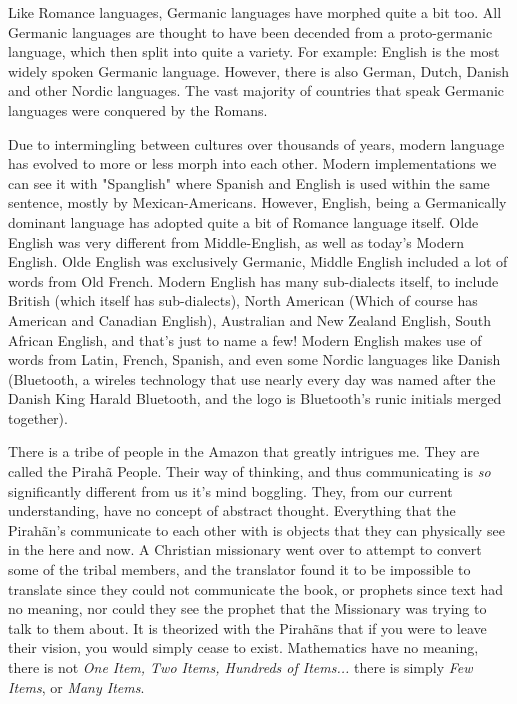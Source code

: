 \documentclass[12pt]{article}
\begin{document}
\par
Like Romance languages, Germanic languages have morphed quite a bit too. All Germanic languages are thought to have been decended from a proto-germanic language, which then split into quite a variety. For example: English is the most widely spoken Germanic language. However, there is also German, Dutch, Danish and other Nordic languages. The vast majority of countries that speak Germanic languages were conquered by the Romans.
\par
Due to intermingling between cultures over thousands of years, modern language has evolved to more or less morph into each other. Modern implementations we can see it with "Spanglish" where Spanish and English is used within the same sentence, mostly by Mexican-Americans. However, English, being a Germanically dominant language has adopted quite a bit of Romance language itself. Olde English was very different from Middle-English, as well as today's Modern English. Olde English was exclusively Germanic, Middle English included a lot of words from Old French. Modern English has many sub-dialects itself, to include British (which itself has sub-dialects), North American (Which of course has American and Canadian English), Australian and New Zealand English, South African English, and that's just to name a few! Modern English makes use of words from Latin, French, Spanish, and even some Nordic languages like Danish (Bluetooth, a wireles technology that use nearly every day was named after the Danish King Harald Bluetooth, and the logo is Bluetooth's runic initials merged together).
\par
There is a tribe of people in the Amazon that greatly intrigues me. They are called the Pirah\~{a} People. Their way of thinking, and thus communicating is \emph{so} significantly different from us it's mind boggling. They, from our current understanding, have no concept of abstract thought. Everything that the Pirah\~{a}n's communicate to each other with is objects that they can physically see in the here and now. A Christian missionary went over to attempt to convert some of the tribal members, and the translator found it to be impossible to translate since they could not communicate the book, or prophets since text had no meaning, nor could they see the prophet that the Missionary was trying to talk to them about. It is theorized with the Pirah\~{a}ns that if you were to leave their vision, you would simply cease to exist. Mathematics have no meaning, there is not \emph{One Item, Two Items, Hundreds of Items...} there is simply \emph{Few Items}, or \emph{Many Items}.
\par

\par
\end{document}
